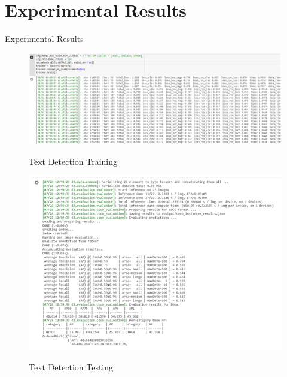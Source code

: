 \documentclass{beamer}
\begin{document}
\section{Experimental Results}
\begin{frame}[allowframebreaks]{Experimental Results}

	\begin{figure}
				{\includegraphics[scale=.3]{Detection_Training_Result}}
				\caption{Text Detection Training}
				\label{Detection_Training_Result}
	\end{figure}

	\begin{figure}
				{\includegraphics[scale=.3]{Detection_Testing_Result}}
				\caption{Text Detection Testing}
				\label{Detection_Testing_Result}
	\end{figure}


\end{frame}
\end{document}
